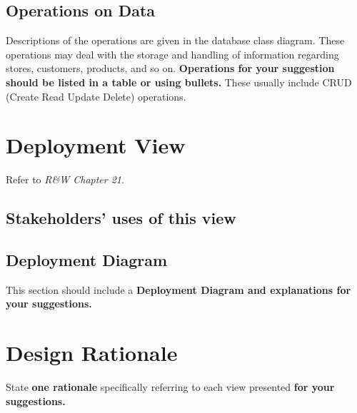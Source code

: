 \subsection{Operations on Data}
Descriptions of the operations are given in the database class diagram. These operations may deal with the storage and handling of information regarding stores, customers, products, and so on. \textbf{Operations for your suggestion should be listed in a table or using bullets.}
These usually include CRUD (Create Read Update Delete) operations.



\section{Deployment View}

Refer to \textit{R\&W Chapter 21}. 

\subsection{Stakeholders’ uses of this view}

\subsection{Deployment Diagram}

This section should include a \textbf{Deployment Diagram and explanations for your suggestions.}

\section{Design Rationale}
State \textbf{one rationale} specifically referring to each view presented \textbf{for your suggestions.}